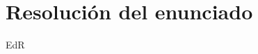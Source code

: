 \documentclass[11pt,a4paper]{article}
\newcommand{\Tipo}[1]{\mathsf{#1}}
\newcommand{\norm}[1]{\vert #1\vert}
\begin{document}
\maketitle

\section*{Resolución del enunciado}

\begin{tad}{EdR}



\end{tad}
\end{document}
